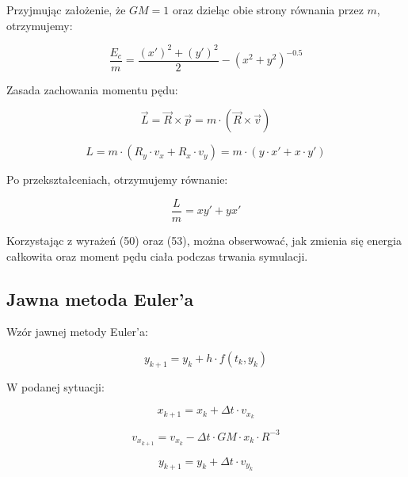 \documentclass{article}
\begin{document}
	Przyjmując założenie, że $GM = 1$ oraz dzieląc obie strony równania przez $m$, otrzymujemy:

	\begin{equation}
		\frac{E_c}{m} = \frac{(x')^2+(y')^2}{2} - (x^2+y^2)^{-0.5}
	\end{equation}

	

	Zasada zachowania momentu pędu:

	\begin{equation}
		\overrightarrow{L} = \overrightarrow{R} \times \overrightarrow{p} = m \cdot (\overrightarrow{R} \times \overrightarrow{v})
	\end{equation}

	\begin{equation}
		L = m \cdot (R_y \cdot v_x + R_x \cdot v_y) = m \cdot (y \cdot x' + x \cdot y')
	\end{equation}

	Po przekształceniach, otrzymujemy równanie:

	\begin{equation}
		\frac{L}{m} = xy'+yx'
	\end{equation}

	Korzystając z wyrażeń (50) oraz (53), można obserwować, jak zmienia się energia całkowita oraz moment pędu ciała podczas trwania symulacji.


	\subsection*{Jawna metoda Euler'a}

	Wzór jawnej metody Euler'a:

	\begin{equation}
		y_{k+1} = y_k + h \cdot f(t_k, y_k)
	\end{equation}

	W podanej sytuacji:

	\begin{equation}
		x_{k+1} = x_k + \Delta t \cdot v_{x_k} 
	\end{equation}

	\begin{equation}
		v_{x_{k+1}} = v_{x_k} - \Delta t \cdot GM \cdot x_k \cdot R^{-3}
	\end{equation}

	\begin{equation}
		y_{k+1} = y_k + \Delta t \cdot v_{y_k} 
	\end{equation}
\end{document}

